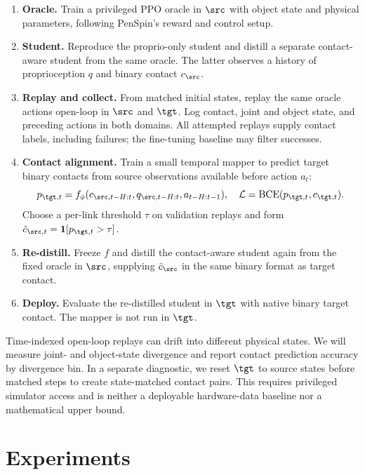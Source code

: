 \begin{enumerate}[leftmargin=*]
  \item \textbf{Oracle.} Train a privileged PPO oracle in $\src$ with object state and physical parameters, following PenSpin's reward and control setup.
  \item \textbf{Student.} Reproduce the proprio-only student and distill a separate contact-aware student from the same oracle. The latter observes a history of proprioception $q$ and binary contact $c_{\src}$.
  \item \textbf{Replay and collect.} From matched initial states, replay the same oracle actions open-loop in $\src$ and $\tgt$. Log contact, joint and object state, and preceding actions in both domains. All attempted replays supply contact labels, including failures; the fine-tuning baseline may filter successes.
  \item \textbf{Contact alignment.} Train a small temporal mapper to predict target binary contacts from source observations available before action $a_t$:
  \begin{equation}
    p_{\tgt,t}=f_{\phi}(c_{\src,t-H:t},q_{\src,t-H:t},a_{t-H:t-1}),
    \quad \mathcal{L}=\operatorname{BCE}(p_{\tgt,t},c_{\tgt,t}).
  \end{equation}
  Choose a per-link threshold $\tau$ on validation replays and form $\tilde c_{\src,t}=\mathbf{1}[p_{\tgt,t}>\tau]$.
  \item \textbf{Re-distill.} Freeze $f$ and distill the contact-aware student again from the fixed oracle in $\src$, supplying $\tilde c_{\src}$ in the same binary format as target contact.
  \item \textbf{Deploy.} Evaluate the re-distilled student in $\tgt$ with native binary target contact. The mapper is not run in $\tgt$.
\end{enumerate}

Time-indexed open-loop replays can drift into different physical states. We will measure joint- and object-state divergence and report contact prediction accuracy by divergence bin. In a separate diagnostic, we reset $\tgt$ to source states before matched steps to create state-matched contact pairs. This requires privileged simulator access and is neither a deployable hardware-data baseline nor a mathematical upper bound.

\FloatBarrier
\section{Experiments}

